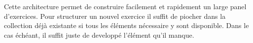 Cette architecture permet de construire facilement et rapidement un large panel d'exercices. Pour structurer un nouvel exercice il suffit de piocher dans la collection déjà existante si tous les éléments nécessaire y sont disponible. Dans le cas échéant, il suffit juste de developpé l'élément qu'il manque.






